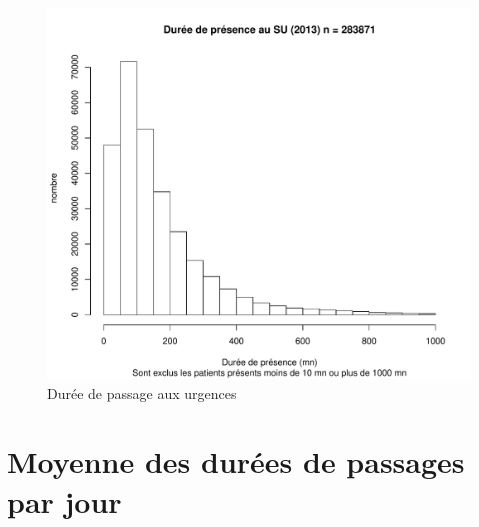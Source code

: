 \documentclass[12pt,english,french,twoside]{book}\usepackage[]{graphicx}\usepackage[]{color}
\makeatletter
\def\maxwidth{ %
  \ifdim\Gin@nat@width>\linewidth
    \linewidth
  \else
    \Gin@nat@width
  \fi
}
\newenvironment{knitrout}{}{} %
\makeatother
\begin{document}
\begin{figure}[ht!]
 \centering
\begin{knitrout}
\color{fgcolor}
\includegraphics[width=\maxwidth]{figure/passages_clean_hist} 

\end{knitrout}

 \caption{Durée de passage aux urgences}
\end{figure}


\section{Moyenne des durées de passages par jour}
\end{document}
